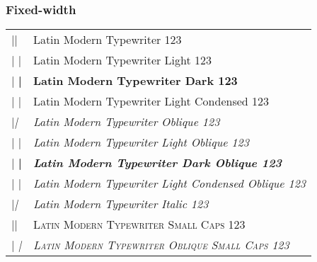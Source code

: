 \documentclass{article}
\makeatletter
\newenvironment{vrb}{\begin{tabular}{@{}p{5cm}l@{}}}{\end{tabular}}
\makeatother
\begin{document}
\subsubsection*{Fixed-width}

\tmstyle
\begin{vrb}
|\ttfamily\tmstyle | & {Latin Modern Typewriter 123} \\
|  \lgweight | & {\lgweight Latin Modern Typewriter Light 123} \\
|  \bfseries | & {\bfseries Latin Modern Typewriter Dark 123} \\
|  \fontseries{lc}\selectfont | & {\fontseries{lc}\selectfont Latin Modern Typewriter Light Condensed 123} \\
|\slshape | & {\slshape Latin Modern Typewriter Oblique 123} \\
|  \lgweight | & {\lgweight\slshape Latin Modern Typewriter Light Oblique 123} \\
|  \bfseries | & {\bfseries\slshape Latin Modern Typewriter Dark Oblique 123} \\
|  \fontseries{lc} | & {\fontseries{lc}\slshape Latin Modern Typewriter Light Condensed Oblique 123} \\
|\itshape | & {\itshape Latin Modern Typewriter Italic 123} \\
|\scshape | & {\scshape Latin Modern Typewriter Small Caps 123} \\
|  \slshape | & {\scshape\slshape Latin Modern Typewriter Oblique Small Caps 123} \\
\end{vrb}
\end{document}
